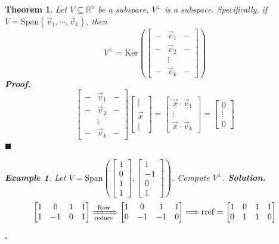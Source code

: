 \documentclass[12pt, a4paper]{article}
\newtheorem{thm}{Theorem}[subsection]
\newtheorem{eg}{Example}[subsection]
\newenvironment*{sol}{\indent\textbf{Solution. }}{\hfill{$\square$}\par}
\newenvironment*{prf}{\indent\textbf{\textit{Proof. }}}{\hfill $\blacksquare$\par}
\def\R{{\mathbb{R}}}
\def\rref{\mathrm{rref}}
\def\Span{\mathrm{Span}}
\def\Ker{\mathrm{Ker}}
\def\vecx{\vec{x}}
\def\vecv{\vec{v}}
\begin{document}
\begin{thm}
	Let $V\subseteq\R^n$ be a subspace, $V^\perp$ is a subspace. Specifically, if $V=\Span(\vecv_1,\cdots,\vecv_k)$, then \[V^\perp=\Ker\left(\begin{bmatrix}-&\vecv_1&-\\-&\vecv_2&-\\&\vdots&\\-&\vecv_k&-\end{bmatrix}\right)\]
	\begin{prf}
		\[\begin{bmatrix}-&\vecv_1&-\\-&\vecv_2&-\\&\vdots&\\-&\vecv_k&-\end{bmatrix}\begin{bmatrix}|\\\vecx\\|\end{bmatrix}=\begin{bmatrix}\vecx\cdot\vecv_1\\\vdots\\\vecx\cdot\vecv_k\end{bmatrix}=\begin{bmatrix}0\\\vdots\\0\end{bmatrix}\]	
	\end{prf}
	\begin{eg}
		Let $V=\Span\left(\begin{bmatrix}1\\0\\1\\1\end{bmatrix},\begin{bmatrix}1\\-1\\0\\1\end{bmatrix}\right)$. Compute $V^\perp$.	
	\begin{sol}
		\[\begin{bmatrix}1&0	&1&1\\1&-1&0&1\end{bmatrix}\xRightarrow[\text{reduce}]{\text{Row}}\begin{bmatrix}1&0&1&1\\0&-1&-1&0\end{bmatrix}\Longrightarrow\rref=\begin{bmatrix}1&0&1&1\\0&1&1&0\end{bmatrix}\]

\end{sol}
\end{eg}
\end{thm}
\end{document}
